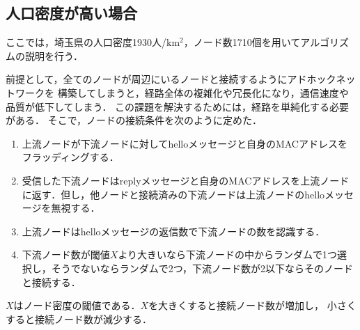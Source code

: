 \documentclass[a4paper, 11pt]{ltjsarticle}
\begin{document}


\clearpage
\subsection{人口密度が高い場合}
ここでは，埼玉県の人口密度1930人/$\mathrm{km^2}$，ノード数1710個を用いてアルゴリズムの説明を行う．

前提として，全てのノードが周辺にいるノードと接続するようにアドホックネットワークを
構築してしまうと，経路全体の複雑化や冗長化になり，通信速度や品質が低下してしまう．
この課題を解決するためには，経路を単純化する必要がある．
そこで，ノードの接続条件を次のように定めた．

\begin{enumerate}[label=\ding{\numexpr171+\arabic*}]
  \item \label{2-1} 上流ノードが下流ノードに対してhelloメッセージと自身のMACアドレスをフラッディングする．
  \item \label{2-2} 受信した下流ノードはreplyメッセージと自身のMACアドレスを上流ノードに返す．但し，他ノードと接続済みの下流ノードは上流ノードのhelloメッセージを無視する．
  \item \label{2-3} 上流ノードはhelloメッセージの返信数で下流ノードの数を認識する．
  \item \label{2-4} 下流ノード数が閾値$X$より大きいなら下流ノードの中からランダムで1つ選択し，そうでないならランダムで2つ，下流ノード数が2以下ならそのノードと接続する．
\end{enumerate}
$X$はノード密度の閾値である．$X$を大きくすると接続ノード数が増加し，
小さくすると接続ノード数が減少する．
\end{document}

